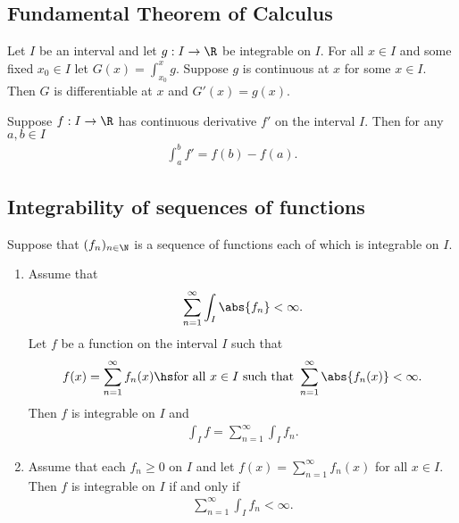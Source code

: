 \documentclass{article}
\begin{document}
\subsection{Fundamental Theorem of Calculus}

\begin{theorem}[Notes 4.10]
	Let $I$ be an interval and let $g:I\to\R$ be integrable on $I$. For all $x\in I$ and
	some fixed $x_0\in I$ let $G(x) = \int_{x_0}^x g$. Suppose $g$ is continuous at $x$
	for some $x\in I$. Then $G$ is differentiable at $x$ and $G'(x)=g(x)$.
\end{theorem}

\begin{theorem}[Notes 4.11]
	Suppose $f:I\to\R$ has continuous derivative $f'$ on the interval $I$. Then for any
	$a,b\in I$
	\begin{align*}
		\int_a^b f' = f(b) - f(a).
	\end{align*}
\end{theorem}

\subsection{Integrability of sequences of functions}

\begin{theorem}[Notes 4.3]
	Suppose that $(f_n)_{n\in\N}$ is a sequence of functions each of which is integrable on $I$.
	\begin{enumerate}
		\item Assume that \begin{align*}
			      \sum_{n=1}^\infty \int_I \abs{f_n} < \infty.
		      \end{align*}
		      Let $f$ be a function on the interval $I$ such that \begin{align*}
			      f(x) = \sum_{n=1}^\infty f_n(x)\hs\text{for all $x\in I$ such that }\sum_{n=1}^\infty \abs{f_n(x)}<\infty.
		      \end{align*}
		      Then $f$ is integrable on $I$ and \begin{align*}
			      \int_I f = \sum_{n=1}^\infty \int_I f_n.
		      \end{align*}
		\item Assume that each $f_n\geq 0$ on $I$ and let $f(x)=\sum_{n=1}^\infty f_n(x)$ for all $x\in I$. Then $f$
		      is integrable on $I$ if and only if \begin{align*}
			      \sum_{n=1}^\infty \int_I f_n < \infty.
		      \end{align*}
	\end{enumerate}
\end{theorem}
\end{document}
